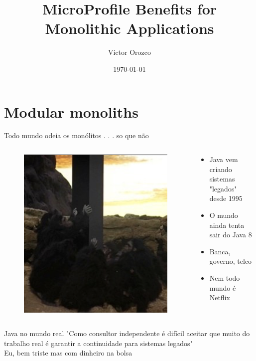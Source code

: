 \documentclass[aspectratio=169]{beamer}
\title{MicroProfile Benefits for Monolithic Applications}
\author{Víctor Orozco}
\institute{@tuxtor}
\date{\today}
\begin{document}
\frame{\titlepage}

\section{Modular monoliths}



\begin{frame}{Todo mundo odeia os monólitos . . . so que não}

\begin{columns}
\begin{column}{0.5\textwidth}
	\begin{figure}
		\centering
		\includegraphics[width=0.7\linewidth]{Images/space}
	\end{figure}
	\end{column}
	\begin{column}{0.5\textwidth}  %
		\begin{itemize}
        	\item Java vem criando sistemas "legados" desde 1995
            \item O mundo ainda tenta sair do Java 8
            \item Banca, governo, telco
            \item Nem todo mundo é Netflix
        \end{itemize}
	\end{column}
\end{columns}


\end{frame}

\begin{frame}{Java no mundo real}
"Como consultor independente é difícil aceitar que muito do trabalho real é garantir a continuidade para sistemas legados"\\

{\scriptsize Eu, bem triste mas com dinheiro na bolsa}
\end{frame}
\end{document}
